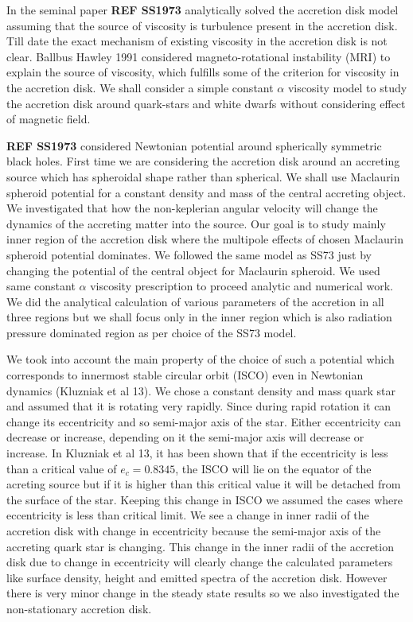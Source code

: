 \documentclass[useAMS,usenatbib]{mn2e}
\newcommand{\mref}[1]{\textbf{REF #1}}
\begin{document}
In the seminal paper \mref{SS1973} analytically solved the accretion disk model assuming that the source of viscosity is turbulence present in the accretion disk. Till date the exact mechanism of existing viscosity in the accretion disk is not clear. Ballbus Hawley 1991 considered magneto-rotational instability (MRI) to explain the source of viscosity, which fulfills some of the criterion for viscosity in the accretion disk. We shall consider a simple constant $\alpha$ viscosity model to study the accretion disk around quark-stars and white dwarfs without considering effect of magnetic field.

\mref{SS1973} considered Newtonian potential around spherically symmetric black holes. First time we are considering the accretion disk around an accreting source which has spheroidal shape rather than spherical. We shall use Maclaurin spheroid potential for a constant density and mass of the central accreting object. We investigated that how the non-keplerian angular velocity will change the dynamics of the accreting matter into the source. Our goal is to study mainly inner region of the accretion disk where the multipole effects of chosen Maclaurin spheroid potential dominates. We followed the same model as SS73 just by changing the potential of the central object for Maclaurin spheroid. We used same constant $\alpha$ viscosity prescription to proceed analytic and numerical work. We did the analytical calculation of various parameters of the accretion in all three regions but we shall focus only in the inner region which is also radiation pressure dominated region as per choice of the SS73 model. 

We took into account the main property of the choice of such a potential which corresponds to innermost stable circular orbit (ISCO) even in Newtonian dynamics (Kluzniak et al 13). We chose a constant density and mass quark star and assumed that it is rotating very rapidly. Since during rapid rotation it can change its eccentricity and so semi-major axis of the star. Either eccentricity can decrease or increase, depending on it the semi-major axis will decrease or increase. In Kluzniak et al 13, it has been shown that if the eccentricity is less than a critical value of $e_c = 0.8345$, the ISCO will lie on the equator of the acreting source but if it is higher than this critical value it will be detached from the surface of the star. Keeping this change in ISCO we assumed the cases where eccentricity is less than critical limit. We see a change in inner radii of the accretion disk with change in eccentricity because the semi-major axis of the accreting quark star is changing. This change in the inner radii of the accretion disk due to change in eccentricity will clearly change the calculated parameters like surface density, height and emitted spectra of the accretion disk. However there is very minor change in the steady state results so we also investigated the non-stationary accretion disk.
\end{document}
